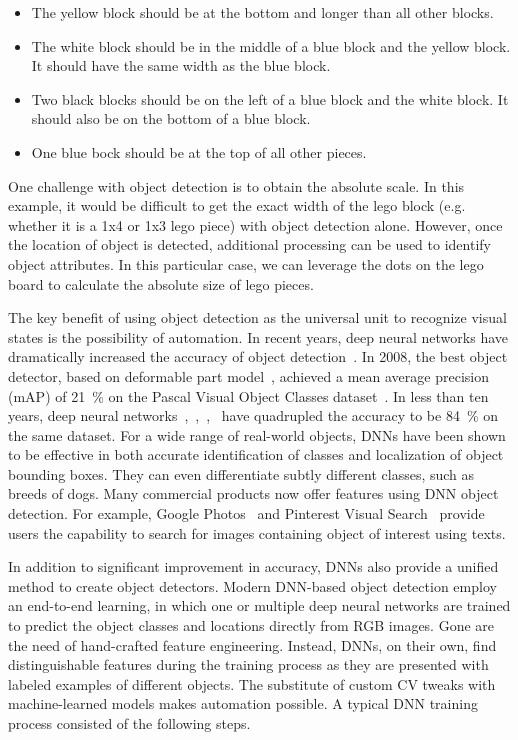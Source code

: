 \begin{itemize}
  \item The yellow block should be at the bottom and longer than all other blocks.
  \item The white block should be in the middle of a blue block and the yellow
  block. It should have the same width as the blue block.
  \item Two black blocks should be on the left of a blue block and the white
  block. It should also be on the bottom of a blue block.
  \item One blue bock should be at the top of all other pieces.
\end{itemize}

One challenge with object detection is to obtain the absolute scale. In this
example, it would be difficult to get the exact width of the lego block (e.g.
whether it is a 1x4 or 1x3 lego piece) with object detection alone. However,
once the location of object is detected, additional processing can be used to
identify object attributes. In this particular case, we can leverage the dots
on the lego board to calculate the absolute size of lego pieces.

The key benefit of using object detection as the universal unit to recognize
visual states is the possibility of automation. In recent years, deep neural
networks have dramatically increased the accuracy of object
detection~\cite{zou2019object}. In 2008, the best object detector, based on
deformable part model~\cite{felzenszwalb2008discriminatively}, achieved a mean
average precision (mAP) of 21~\% on the Pascal Visual Object Classes
dataset~\cite{everingham2010pascal}. In less than ten years, deep neural
networks~\cite{he2017mask},~\cite{Ren2015},~\cite{He2016},~\cite{lin2017focal}
have quadrupled the accuracy to be 84~\% on the same dataset. For a wide range
of real-world objects, DNNs have been shown to be effective in both accurate
identification of classes and localization of object bounding boxes.  They can
even differentiate subtly different classes, such as breeds of dogs. Many
commercial products now offer features using DNN object detection. For example,
Google Photos~\cite{googlePhoto} and Pinterest Visual Search~\cite{pinterest}
provide users the capability to search for images containing object of interest
using texts.

In addition to significant improvement in accuracy, DNNs also provide a unified
method to create object detectors. Modern DNN-based object detection employ an
end-to-end learning, in which one or multiple deep neural networks are trained
to predict the object classes and locations directly from RGB images. Gone are
the need of hand-crafted feature engineering. Instead, DNNs, on their own, find
distinguishable features during the training process as they are presented with
labeled examples of different objects. The substitute of custom CV tweaks with
machine-learned models makes automation possible. A typical DNN training process
consisted of the following steps.

